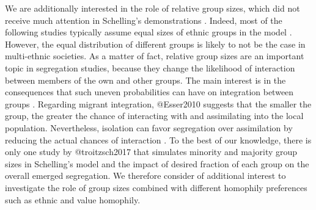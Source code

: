 \documentclass{ws-acs}
\begin{document}
We are additionally interested in the role of relative group sizes, which did not receive much attention in Schelling's demonstrations \cite{schelling71}. Indeed, most of the following studies typically assume equal sizes of ethnic groups in the model \cite{troitzsch2017}. However, the equal distribution of different groups is likely to not be the case in multi-ethnic societies. As a matter of fact, relative group sizes are an important topic in segregation studies, because they change the likelihood of interaction between members of the own and other groups. The main interest is in the consequences that such uneven probabilities can have on integration between groups \cite{massey88}. Regarding migrant integration, @Esser2010 suggests that the smaller the group, the greater the chance of interacting with and assimilating into the local population. Nevertheless, isolation can favor segregation over assimilation by reducing the actual chances of interaction \cite{massey88}. To the best of our knowledge, there is only one study by @troitzsch2017 that simulates minority and majority group sizes in Schelling's model and the impact of desired fraction of each group on the overall emerged segregation. We therefore consider of additional interest to investigate the role of group sizes combined with different homophily preferences such as ethnic and value homophily.
\end{document}
